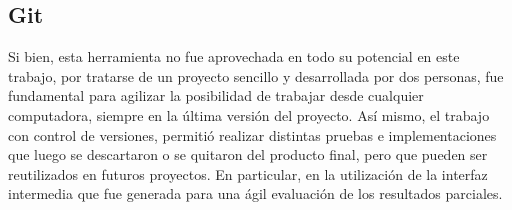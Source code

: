 \subsection*{Git}
Si bien, esta herramienta no fue aprovechada en todo su potencial en este trabajo, por tratarse de un proyecto sencillo y desarrollada por dos personas, fue fundamental para agilizar la posibilidad de trabajar desde cualquier computadora, siempre en la \'ultima versi\'on del proyecto.
As\'i mismo, el trabajo con control de versiones, permiti\'o realizar distintas pruebas e implementaciones que luego se descartaron o se quitaron del producto final, pero que pueden ser reutilizados en futuros proyectos. En particular, en la utilizaci\'on de la interfaz intermedia que fue generada para una \'agil evaluaci\'on de los resultados parciales.\\









